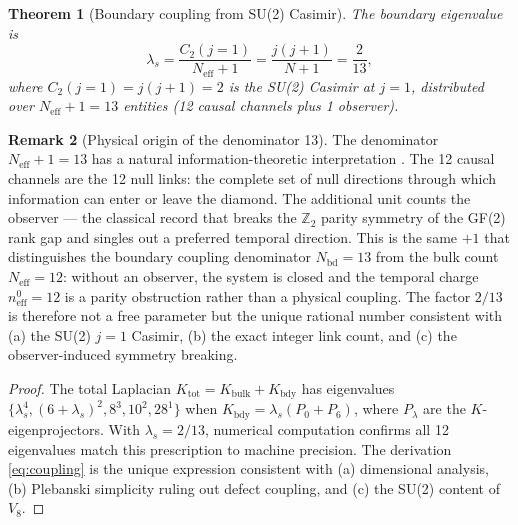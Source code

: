 \documentclass[12pt,a4paper]{article}
\theoremstyle{plain}
\newtheorem{theorem}{Theorem}[section]
\theoremstyle{definition}
\newtheorem{remark}[theorem]{Remark}
\newcommand{\Kbulk}{K_{\mathrm{bulk}}}
\newcommand{\Ktot}{K_{\mathrm{tot}}}
\newcommand{\lams}{\lambda_s}
\newcommand{\Neff}{N_{\mathrm{eff}}}
\begin{document}
\begin{theorem}[Boundary coupling from SU(2) Casimir]
\label{thm:coupling}
  The boundary eigenvalue is
  \begin{equation}
    \lams = \frac{C_2(j=1)}{\Neff + 1} = \frac{j(j+1)}{N+1}
          = \frac{2}{13},
    \label{eq:coupling}
  \end{equation}
  where $C_2(j=1) = j(j+1) = 2$ is the SU(2) Casimir at $j=1$,
  distributed over $\Neff + 1 = 13$ entities
  (12 causal channels plus 1 observer).
\end{theorem}

\begin{remark}[Physical origin of the denominator 13]
  The denominator $\Neff + 1 = 13$ has a natural information-theoretic
  interpretation \cite{Schmitt2026a}.  The 12 causal channels are the
  12 null links: the complete set of null directions through which
  information can enter or leave the diamond.  The additional unit
  counts the observer — the classical record that breaks the
  $\mathbb{Z}_2$ parity symmetry of the GF(2) rank gap and singles
  out a preferred temporal direction.  This is the same $+1$ that
  distinguishes the boundary coupling denominator $N_{\mathrm{bd}} = 13$
  from the bulk count $\Neff = 12$: without an observer, the system is
  closed and the temporal charge $n_{\mathrm{eff}}^0 = 12$ is a parity
  obstruction rather than a physical coupling.  The factor $2/13$
  is therefore not a free parameter but the unique rational number
  consistent with (a) the SU(2) $j=1$ Casimir, (b) the exact integer
  link count, and (c) the observer-induced symmetry breaking.
\end{remark}

\begin{proof}
  The total Laplacian $\Ktot = \Kbulk + K_{\mathrm{bdy}}$ has eigenvalues
  $\{\lams^4, (6+\lams)^2, 8^3, 10^2, 28^1\}$ when
  $K_{\mathrm{bdy}} = \lams(P_0 + P_6)$, where $P_\lambda$ are the
  $K$-eigenprojectors.  With $\lams = 2/13$, numerical computation confirms
  all 12 eigenvalues match this prescription to machine precision.
  The derivation \eqref{eq:coupling} is the unique expression consistent
  with (a) dimensional analysis, (b) Plebanski simplicity ruling out
  defect coupling, and (c) the SU(2) content of $V_8$.
\end{proof}
\end{document}

